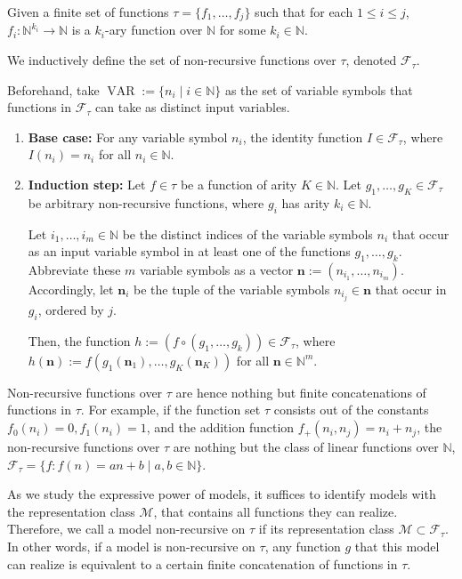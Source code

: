 \begin{definition}
	\label{def:non-recursive-functions}
	Given a finite set of functions $\tau=\{f_1,\dots,f_j\}$ such that for each $1\leq i\leq j$, $f_i:\mathbb{N}^{k_{i}}\to\mathbb{N}$ is a $k_i$-ary function over $\mathbb{N}$ for some $k_i\in\mathbb{N}$.
	
	We inductively define the set of non-recursive functions over $\tau$, denoted $\mathcal{F}_{\tau}$.
	
	Beforehand, take $\operatorname{VAR}:=\{n_i\mid i\in\mathbb{N}\}$ as the set of variable symbols that functions in $\mathcal{F}_{\tau}$ can take as distinct input variables.
	\begin{enumerate}
		\item \textbf{Base case:} For any variable symbol $n_i$, the identity function $I\in \mathcal{F}_{\tau}$, where $I(n_i)=n_i$ for all $n_i\in\mathbb{N}$.
		\item \textbf{Induction step:} Let $f\in\tau$ be a function of arity $K\in\mathbb{N}$. Let $g_1,\dots,g_K\in\mathcal{F}_{\tau}$ be arbitrary non-recursive functions, where $g_i$ has arity $k_i\in\mathbb{N}$. 
		
		Let $i_1,\dots,i_m\in\mathbb{N}$ be the distinct indices of the variable symbols $n_i$ that occur as an input variable symbol in at least one of the functions $g_1,\dots,g_k$. 
		Abbreviate these $m$ variable symbols as a vector $\mathbf{n}:=(n_{i_1},\dots,n_{i_m})$. Accordingly, let $\mathbf{n}_i$ be the tuple of the variable symbols $n_{i_j}\in \mathbf{n}$ that occur in $g_i$, ordered by $j$. 
		
		Then, the function $h:=(f\circ(g_1,\dots,g_k))\in \mathcal{F}_{\tau}$, where $h(\mathbf{n}):=f(g_1(\mathbf{n}_1),\dots,g_K(\mathbf{n}_K))$ for all $\mathbf{n}\in\mathbb{N}^m$.
	\end{enumerate}
\end{definition}
Non-recursive functions over $\tau$ are hence nothing but finite concatenations of functions in $\tau$.
For example, if the function set $\tau$ consists out of the constants $f_0(n_i)=0,f_1(n_i)=1$, and the addition function $f_{+}(n_i,n_j)=n_i+n_j$, the non-recursive functions over $\tau$ are nothing but the class of linear functions over $\mathbb{N}$, $\mathcal{F}_{\tau}=\{f:f(n)=an+b\mid a,b\in\mathbb{N}\}$.

As we study the expressive power of models, it suffices to identify models with the representation class $\mathcal{M}$, that contains all functions they can realize.
Therefore, we call a model non-recursive on $\tau$ if its representation class $\mathcal{M}\subset \mathcal{F}_{\tau}$.
In other words, if a model is non-recursive on $\tau$, any function $g$ that this model can realize is equivalent to a certain finite concatenation of functions in $\tau$.

